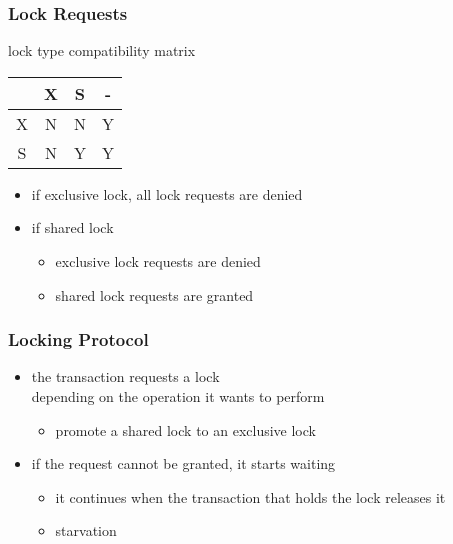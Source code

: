 \documentclass[dvipsnames]{beamer}
\theoremstyle{plain}
\begin{document}
\begin{frame}
  \frametitle{Lock Requests}

  \begin{block}{lock type compatibility matrix}
    \begin{table}
      \begin{tabular}{|c||c|c|c|}\hline
  & X & S & -\\\hline\hline
X & N & N & Y\\\hline
S & N & Y & Y\\\hline
      \end{tabular}
    \end{table}
  \end{block}

  \begin{itemize}
    \item if exclusive lock, all lock requests are denied
    \item if shared lock
    \begin{itemize}
      \item exclusive lock requests are denied
      \item shared lock requests are granted
    \end{itemize}
  \end{itemize}
\end{frame}

\begin{frame}
  \frametitle{Locking Protocol}

  \begin{itemize}
    \item the transaction requests a lock\\
      depending on the operation it wants to perform
    \begin{itemize}
      \item promote a shared lock to an exclusive lock
    \end{itemize}

    \pause
    \item if the request cannot be granted, it starts waiting
    \begin{itemize}
      \item it continues when the transaction that holds the lock releases it
      \item \alert{starvation}
    \end{itemize}
  \end{itemize}
\end{frame}
\end{document}
